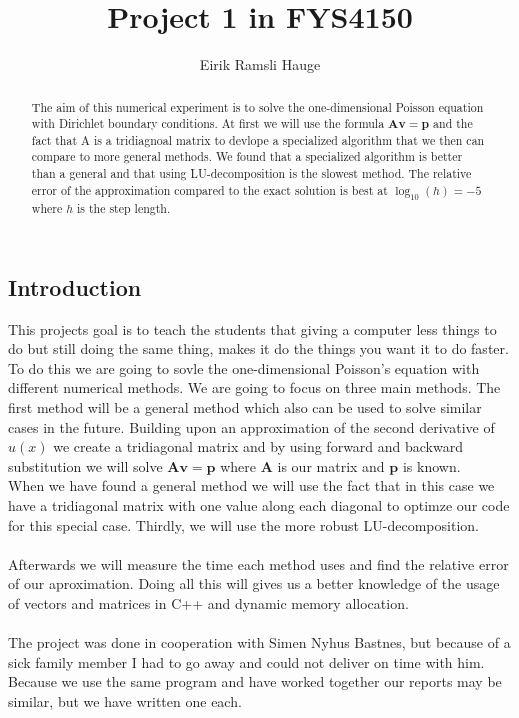 \documentclass[12pt,a4paper]{article}
\author{Eirik Ramsli Hauge}
\title{Project 1 in FYS4150}
\newcommand{\V}[1]{\mathbf{#1}}
\begin{document}
	\maketitle
	
\begin{abstract}
The aim of this numerical experiment is to solve the one-dimensional Poisson equation with Dirichlet boundary conditions. At first we will use the formula $\V{A} \V{v} = \V{p}$ and the fact that A is a tridiagnoal matrix to devlope a specialized algorithm that we then can compare to more general methods. We found that a specialized algorithm is better than a general and that using LU-decomposition is the slowest method. The relative error of the approximation compared to the exact solution is best at $\log_{10}(h) = -5$ where $h$ is the step length.
\end{abstract}
\subsection*{Introduction}
This projects goal is to teach the students that giving a computer less things to do but still doing the same thing, makes it do the things you want it to do faster.\cite{Project} To do this we are going to sovle the one-dimensional Poisson's equation with different numerical methods. We are going to focus on three main methods. 
The first method will be a general method which also can be used to solve similar cases in the future. Building upon an approximation of the second derivative of $u(x)$ we create a tridiagonal matrix and by using forward and backward substitution we will solve $\V{A} \V{v} = \V{p}$ where $\V{A}$ is our matrix and $\V{p}$ is known. \\
When we have found a general method we will use the fact that in this case we have a tridiagonal matrix with one value along each diagonal to optimze our code for this special case. Thirdly, we will use the more robust LU-decomposition. \\ \\
Afterwards we will measure the time each method uses and find the relative error of our aproximation. Doing all this will gives us a better knowledge of the usage of vectors and matrices in C++ and dynamic memory allocation.  \\ \\
The project was done in cooperation with Simen Nyhus Bastnes, but because of a sick family member I had to go away and could not deliver on time with him. Because we use the same program and have worked together our reports may be similar, but we have written one each.
\end{document}
